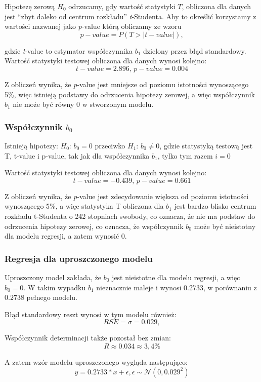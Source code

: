 \documentclass[a4paper,11pt]{article}
\begin{document}
Hipotezę zerową \(H_0\) odrzucamy, gdy wartość statystyki \(T\), obliczona dla danych jest “zbyt daleko od centrum rozkładu” \textit{t}-Studenta. Aby to określić korzystamy z wartości nazwanej jako \textit{p}-value którą obliczamy ze wzoru 
\[p-value = P(T > |t-value|),\]

gdzie \textit{t}-value to estymator współczynnika \(b_1\) dzielony przez błąd standardowy.
Wartość statystyki testowej obliczona dla danych wynosi kolejno:
\[t-value = 2.896 \text{, }p-value = 0.004\]

Z obliczeń wynika, że \textit{p}-value jest mniejsze od poziomu istotności wynoszącego 5\%, więc istnieją podstawy do odrzucenia hipotezy zerowej, a więc współczynnik \(b_1\) nie może być równy 0 w stworzonym modelu.

\subsubsection{Współczynnik \(b_0\)}

Istnieją hipotezy:
 \(H_0\): \(b_0=0\) przeciwko \(H_1\): \(b_0\neq0\), gdzie statystyką testową jest T, t-value i p-value, tak jak dla współczynnika \(b_1\), tylko tym razem \(i = 0\)

Wartość statystyki testowej obliczona dla danych wynosi kolejno:
\[t-value = -0.439 \text{, } p-value = 0.661\]

Z obliczeń wynika, że \textit{p}-value jest zdecydowanie większa od poziomu istotności wynoszącego 5\%, a więc statystyka T obliczona dla \(b_1\) jest bardzo blisko centrum rozkładu t-Studenta o 242 stopniach swobody, co oznacza, że nie ma podstaw do odrzucenia hipotezy zerowej, co oznacza, że współczynnik \(b_0\) może być nieistotny dla modelu regresji, a zatem wynosić 0.


\subsubsection{Regresja dla uproszczonego modelu}

Uproszczony model zakłada, że \(b_0\) jest nieistotne dla modelu regresji, a więc \(b_0=0\).
W takim wypadku \(b_1\) nieznacznie maleje i wynosi 0.2733, w porównaniu z 0.2738 pełnego modelu.

Błąd standardowy reszt wynosi w tym modelu również: 
\[RSE = \sigma = 0.029,\]

Współczynnik determinacji także pozostał bez zmian:
\[R\approx0.034\approx3,4\%\]

\newpage
A zatem wzór modelu uproszczonego wygląda następująco:
\[y = 0.2733 * x + \epsilon, \epsilon \sim \mathcal{N}(0, 0.029^2 )\]
\end{document}
